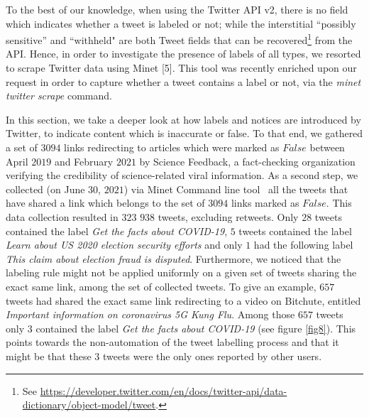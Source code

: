 \documentclass{article}
\begin{document}
\smallskip

To the best of our knowledge, when using the Twitter API v2, there is no field which indicates whether a tweet is labeled or not; while the interstitial ``possibly sensitive'' and ``withheld" are both Tweet fields that can be recovered\footnote{See \href{https://developer.twitter.com/en/docs/twitter-api/data-dictionary/object-model/tweet}{https://developer.twitter.com/en/docs/twitter-api/data-dictionary/object-model/tweet}.} from the API. Hence, in order to investigate the presence of labels of all types, we resorted to scrape Twitter data using Minet [5]. This tool was recently enriched upon our request in order to capture whether a tweet contains a label or not, via the {\it minet twitter scrape} command.

\smallskip

In this section, we take a deeper look at how labels and notices are introduced by Twitter, to indicate content which is inaccurate or false. To that end, we gathered a set of $3094$ links redirecting to articles which were marked as $False$ between April $2019$ and February $2021$ by Science Feedback, a fact-checking organization verifying the credibility of science-related viral information. As a second step, we collected (on June $30$, $2021$) via Minet Command line tool~\cite{minet} all the tweets that have shared a link which belongs to the set of $3094$ links marked as $False$. This data collection resulted in $323$ $938$ tweets, excluding retweets. Only $28$ tweets contained the label { \it Get the facts about COVID-19}, $5$ tweets contained the label {\it Learn about US 2020 election security efforts} and only $1$ had the following label {\it This claim about election fraud is disputed}. Furthermore, we noticed that the labeling rule might not be applied uniformly on a given set of tweets sharing the exact same link, among the set of collected tweets. To give an example, $657$ tweets had shared the exact same link redirecting to a video on Bitchute, entitled {\it Important information on coronavirus 5G Kung Flu}. Among those $657$ tweets only $3$ contained the label {\it Get the facts about COVID-19} (see figure \ref{fig8}). This points towards the non-automation of the tweet labelling process and that it might be that these $3$ tweets were the only ones reported by other users. 
\end{document}
